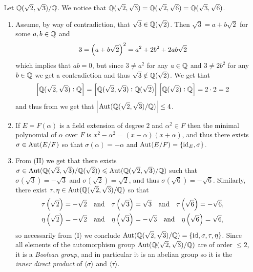 \documentclass[11pt,a4paper]{article}
\begin{document}
\begin{example}
  \label{exmp:galois-q-sqrt-two-sqrt-three}
  Let $\mathbb{Q}(\sqrt 2,\sqrt 3) / \mathbb{Q}$.
  We notice that
  $\mathbb{Q}(\sqrt 2,\sqrt 3) = \mathbb{Q}(\sqrt 2,\sqrt 6) = \mathbb{Q}(\sqrt 3,\sqrt 6)$.
  \begin{enumerate}
    \item[(I)] Assume, by way of contradiction,
      that $\sqrt{3} \in \mathbb{Q}(\sqrt 2)$.
      Then $\sqrt{3} = a + b\sqrt{2}$ for some $a,b \in \mathbb{Q}$ and
      \[
        3 =
        \del{a + b\sqrt{2}}^2 =
        a^2 + 2b^2 + 2ab\sqrt{2}
      \]
      which implies that $ab = 0$, but since $3 \neq a^2$
      for any $a \in \mathbb{Q}$ and $3 \neq 2b^2$ for any $b \in \mathbb{Q}$
      we get a contradiction and thus $\sqrt{3} \notin \mathbb{Q}(\sqrt 2)$.
      We get that
      \[
        \left[\mathbb{Q}(\sqrt 2,\sqrt 3) : \mathbb{Q}\right] =
        \left[\mathbb{Q}(\sqrt 2,\sqrt 3) : \mathbb{Q}(\sqrt 2)\right]
        \left[\mathbb{Q}(\sqrt 2) : \mathbb{Q}\right] = 2 \cdot 2 = 2
      \]
      and thus from 
      we get that $\left\lvert\operatorname{Aut}(\mathbb{Q}(\sqrt 2,\sqrt 3) / \mathbb{Q})\right\rvert \le 4$.
    \item[(II)] If $E = F(\alpha)$ is a field extension of degree $2$
      and $\alpha^2 \in F$ then the minimal polynomial of $\alpha$ over $F$ is
      $x^2 - \alpha^2 = (x - \alpha)(x + \alpha)$,
      and thus there exists $\sigma \in \operatorname{Aut}(E/F)$ so that
      $\sigma(\alpha) = -\alpha$ and
      $\operatorname{Aut}(E/F) = \left\{\operatorname{id}_E,\sigma\right\}$.
    \item[(III)] From (II) we get that there exists
      $\sigma \in \operatorname{Aut}(\mathbb{Q}(\sqrt 2, \sqrt 3) / \mathbb{Q}(\sqrt 2)) \leqslant
      \operatorname{Aut}(\mathbb{Q}(\sqrt 2, \sqrt 3) / \mathbb{Q})$ such that $\sigma(\sqrt 3) = -\sqrt 3$
      and $\sigma(\sqrt 2) = \sqrt 2$, and thus $\sigma(\sqrt 6) = -\sqrt 6$.
      Similarly, there exist $\tau,\eta \in \operatorname{Aut}(\mathbb{Q}(\sqrt 2, \sqrt 3) / \mathbb{Q})$
      so that
      \begin{gather*}
        \tau\del{\sqrt 2} = -\sqrt 2 \tand
        \tau\del{\sqrt 3} = \sqrt 3 \tand
        \tau\del{\sqrt 6} = -\sqrt 6, \\
        \eta\del{\sqrt 2} = -\sqrt 2 \tand
        \eta\del{\sqrt 3} = -\sqrt 3 \tand
        \eta\del{\sqrt 6} = \sqrt 6,
      \end{gather*}
      so necessarily from (I) we conclude
      $\operatorname{Aut}(\mathbb{Q}(\sqrt 2, \sqrt 3) / \mathbb{Q}) = \left\{\operatorname{id},\sigma,\tau,\eta\right\}$.
      Since all elements of the automorphism group
      $\operatorname{Aut}(\mathbb{Q}(\sqrt 2, \sqrt 3) / \mathbb{Q})$ are of
      order $\le 2$, it is a \textit{Boolean group}, and in particular
      it is an abelian group so it is the \textit{inner direct
      product} of $\langle \sigma \rangle$ and $\langle \tau \rangle$.

\end{enumerate}
\end{example}
\end{document}
